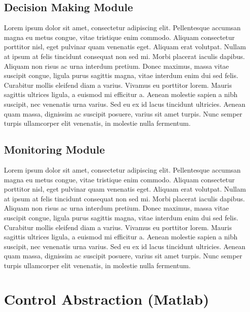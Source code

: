 \subsection{Decision Making Module}

Lorem ipsum dolor sit amet, consectetur adipiscing elit. Pellentesque accumsan magna eu metus congue, vitae tristique enim commodo. Aliquam consectetur porttitor nisl, eget pulvinar quam venenatis eget. Aliquam erat volutpat. Nullam at ipsum at felis tincidunt consequat non sed mi. Morbi placerat iaculis dapibus. Aliquam non risus ac urna interdum pretium. Donec maximus, massa vitae suscipit congue, ligula purus sagittis magna, vitae interdum enim dui sed felis. Curabitur mollis eleifend diam a varius. Vivamus eu porttitor lorem. Mauris sagittis ultrices ligula, a euismod mi efficitur a. Aenean molestie sapien a nibh suscipit, nec venenatis urna varius. Sed eu ex id lacus tincidunt ultricies. Aenean quam massa, dignissim ac suscipit posuere, varius sit amet turpis. Nunc semper turpis ullamcorper elit venenatis, in molestie nulla fermentum.

\subsection{Monitoring Module}

Lorem ipsum dolor sit amet, consectetur adipiscing elit. Pellentesque accumsan magna eu metus congue, vitae tristique enim commodo. Aliquam consectetur porttitor nisl, eget pulvinar quam venenatis eget. Aliquam erat volutpat. Nullam at ipsum at felis tincidunt consequat non sed mi. Morbi placerat iaculis dapibus. Aliquam non risus ac urna interdum pretium. Donec maximus, massa vitae suscipit congue, ligula purus sagittis magna, vitae interdum enim dui sed felis. Curabitur mollis eleifend diam a varius. Vivamus eu porttitor lorem. Mauris sagittis ultrices ligula, a euismod mi efficitur a. Aenean molestie sapien a nibh suscipit, nec venenatis urna varius. Sed eu ex id lacus tincidunt ultricies. Aenean quam massa, dignissim ac suscipit posuere, varius sit amet turpis. Nunc semper turpis ullamcorper elit venenatis, in molestie nulla fermentum.

\section{Control Abstraction (Matlab)}
\label{sec:control_abs}

